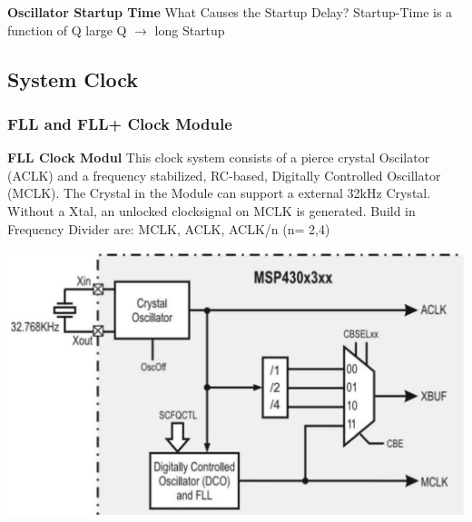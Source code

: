 \textbf{Oscillator Startup Time}\newline
What Causes the Startup Delay?\newline
Startup-Time is a function of Q \qquad large Q $ \rightarrow $ long Startup
\clearpage

\subsection{System Clock }
\subsubsection{\acs{FLL} and \acs{FLL}+ Clock Module}
\begin{minipage}{0.55\linewidth}
    \textbf{\acs{FLL} Clock Modul}\newline
    This clock system consists of a pierce crystal Oscilator (\acs{ACLK}) and a frequency stabilized, \acs{RC}-based, Digitally Controlled Oscillator (\acs{MCLK}).\newline
    The Crystal in the Module can support a external 32kHz Crystal.
    Without a Xtal, an unlocked clocksignal on \acs{MCLK} is generated.\newline\newline
    Build in Frequency Divider are:\newline
    \acs{MCLK}, \acs{ACLK}, \acs{ACLK}/n (n= 2,4)
\end{minipage}
\begin{minipage}{0.45\linewidth}
    \includegraphics[width=0.8\linewidth]{images/FLLClock} 
\end{minipage}


